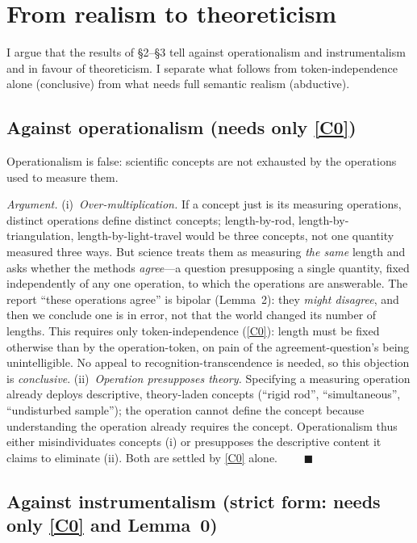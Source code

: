 \documentclass[12pt]{article}
\begin{document}
\section{From realism to theoreticism}

I argue that the results of \S2--\S3 tell against operationalism and
instrumentalism and in favour of theoreticism. I separate what follows
from token-independence alone (conclusive) from what needs full semantic
realism (abductive).

\subsection{Against operationalism (needs only \ref{C0})}

\begin{description}[leftmargin=1.6em,style=nextline]
\item[Claim 4.] Operationalism is false: scientific concepts are not
exhausted by the operations used to measure them.
\end{description}

\noindent\emph{Argument.} (i)~\emph{Over-multiplication.} If a concept
just is its measuring operations, distinct operations define distinct
concepts; length-by-rod, length-by-triangulation, length-by-light-travel
would be three concepts, not one quantity measured three ways. But science
treats them as measuring \emph{the same} length and asks whether the
methods \emph{agree}---a question presupposing a single quantity, fixed
independently of any one operation, to which the operations are
answerable. The report ``these operations agree'' is bipolar (Lemma~2):
they \emph{might disagree}, and then we conclude one is in error, not that
the world changed its number of lengths. This requires only
token-independence (\ref{C0}): length must be fixed otherwise than by the
operation-token, on pain of the agreement-question's being unintelligible.
No appeal to recognition-transcendence is needed, so this objection is
\emph{conclusive}. (ii)~\emph{Operation presupposes theory.} Specifying a
measuring operation already deploys descriptive, theory-laden concepts
(``rigid rod'', ``simultaneous'', ``undisturbed sample''); the operation
cannot define the concept because understanding the operation already
requires the concept. Operationalism thus either misindividuates concepts
(i) or presupposes the descriptive content it claims to eliminate (ii).
Both are settled by \ref{C0} alone.
$\qquad\blacksquare$

\subsection{Against instrumentalism (strict form: needs only \ref{C0} and Lemma~0)}
\end{document}
